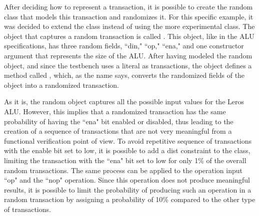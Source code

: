 After deciding how to represent a transaction, it is possible to create the
random class that models this transaction and randomizes it. For this specific
example, it was decided to extend the class  instead of using the
more experimental  class. The object that captures a random
transaction is called . This object, like in the ALU
specifications, has three random fields, ``din," ``op," ``ena," and one
constructor argument that represents the size of the ALU. After having modeled
the random object, and since the testbench uses a literal  as
transactions, the object defines a method called , which, as the
name says, converts the randomized fields of the object into a randomized
transaction.

As it is, the random object captures all the possible input values for the Leros
ALU. However, this implies that a randomized transaction has the same
probability of having the ``ena" bit enabled or disabled, thus leading to the
creation of a sequence of transactions that are not very meaningful from a
functional verification point of view. To avoid repetitive sequence of
transactions with the enable bit set to low, it is possible to add a dist
constraint to the  class, limiting the transaction with
the ``ena" bit set to low for only 1\% of the overall random transactions. The
same process can be applied to the operation input ``op" and the ``nop"
operation. Since this operation does not produce meaningful results, it is
possible to limit the probability of producing such an operation in a random
transaction by assigning a probability of 10\% compared to the other type of
transactions.



